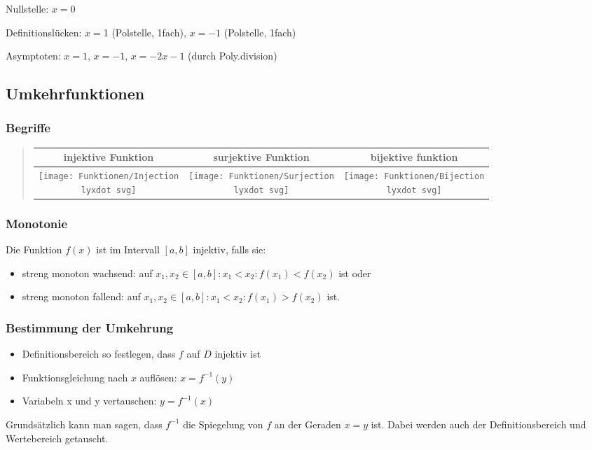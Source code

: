 Nullstelle: $x=0$

Definitionslücken: $x=$1 (Polstelle, 1fach), $x=-1$ (Polstelle,
1fach)

Asymptoten: $x=1$, $x=-1$, $x=-2x-1$ (durch Poly.division)


\subsection*{Umkehrfunktionen}


\subsubsection*{Begriffe}
\begin{verse}
\begin{tabular}{|c|c|c|}
\hline 
injektive Funktion & surjektive Funktion & bijektive funktion\tabularnewline
\hline 
\hline 
\texttt{[image: Funktionen/Injection\\lyxdot svg]} & \texttt{[image: Funktionen/Surjection\\lyxdot svg]} & \texttt{[image: Funktionen/Bijection\\lyxdot svg]}\tabularnewline
\hline 
\end{tabular}
\end{verse}

\subsubsection*{Monotonie}

Die Funktion $f(x)$ ist im Intervall $[a,b]$ injektiv, falls sie:
\begin{itemize}
\item streng monoton wachsend: auf $x_{1},x_{2}\in[a,b]:x_{1}<x_{2}:f(x_{1})<f(x_{2})$
ist oder
\item streng monoton fallend: auf $x_{1},x_{2}\in[a,b]:x_{1}<x_{2}:f(x_{1})>f(x_{2})$
ist.
\end{itemize}

\subsubsection*{Bestimmung der Umkehrung}
\begin{itemize}
\item Definitionsbereich so festlegen, dass $f$ auf $D$ injektiv ist
\item Funktionsgleichung nach $x$ auflösen: $x=f^{-1}(y)$
\item Variabeln x und y vertauschen: $y=f^{-1}(x)$
\end{itemize}
Grundsätzlich kann man sagen, dass $f^{-1}$ die Spiegelung von $f$
an der Geraden $x=y$ ist. Dabei werden auch der Definitionsbereich
und Wertebereich getauscht.
